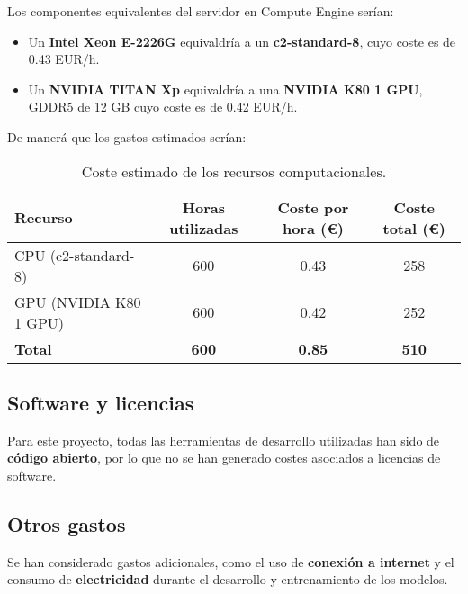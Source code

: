 Los componentes equivalentes del servidor en Compute Engine serían:
\begin{itemize}
  \item Un \textbf{Intel Xeon E-2226G} equivaldría a un \textbf{c2-standard-8}, cuyo coste es de 0.43 EUR/h.
  \item Un \textbf{NVIDIA TITAN Xp} equivaldría a una \textbf{NVIDIA K80 1 GPU}, GDDR5 de 12 GB cuyo coste es de 0.42
        EUR/h.
\end{itemize}

De manerá que los gastos estimados serían:
\begin{table}[htp]\label{tab:recursos-computacionales}
  \centering
  \begin{adjustbox}{width=\linewidth}
    \begin{tabular}{|l|c|c|c|}
      \hline
      \textbf{Recurso}       & \textbf{Horas utilizadas} & \textbf{Coste por hora (€)} &
      \textbf{Coste total (€)}                                                                        \\ \hline
      CPU (c2-standard-8)    & 600                       & 0.43                        & 258          \\
      GPU (NVIDIA K80 1 GPU) & 600                       & 0.42                        & 252          \\ \hline
      \textbf{Total}         & \textbf{600}              & \textbf{0.85}               & \textbf{510} \\ \hline
    \end{tabular}
  \end{adjustbox}
  \caption{Coste estimado de los recursos computacionales.}
\end{table}


\subsection{Software y licencias}\label{subsec:software-y-licencias}
Para este proyecto, todas las herramientas de desarrollo utilizadas han sido de \textbf{código abierto}, por lo que no
se han generado costes asociados a licencias de software.

\subsection{Otros gastos}\label{subsec:otros-gastos}
Se han considerado gastos adicionales, como el uso de \textbf{conexión a internet} y el consumo de
\textbf{electricidad} durante el desarrollo y entrenamiento de los modelos.

